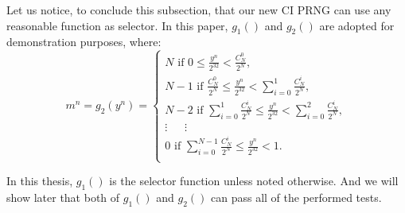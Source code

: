 Let us notice, to conclude this subsection, that our new CI PRNG can use any reasonable function as selector. In this paper, $g_1()$ and $g_2()$ are adopted for demonstration purposes, where:
\begin{equation}
m^n = g_2(y^n)=
\left\{
\begin{array}{l}
N \text{ if }0 \leqslant\frac{y^n}{2^{32}}<\frac{C^0_N}{2^N},\\
N-1 \text{ if }\frac{C^0_N}{2^N} \leqslant\frac{y^n}{2^{32}}<\sum_{i=0}^1\frac{C^i_N}{2^N},\\
N-2 \text{ if }\sum_{i=0}^1\frac{C^i_N}{2^N} \leqslant\frac{y^n}{2^{32}}<\sum_{i=0}^2\frac{C^i_N}{2^N},\\
\vdots~~~~~ ~~\vdots~~~ ~~~~\\
0 \text{ if }\sum_{i=0}^{N-1}\frac{C^i_N}{2^N} \leqslant\frac{y^n}{2^{32}}<1.\\
\end{array}
\right.
\end{equation}

In this thesis, $g_1()$ is the selector function unless noted otherwise. And we will show later that both of $g_1()$ and $g_2()$ can pass all of the performed tests. 

%
%
%
%
%
%
%


